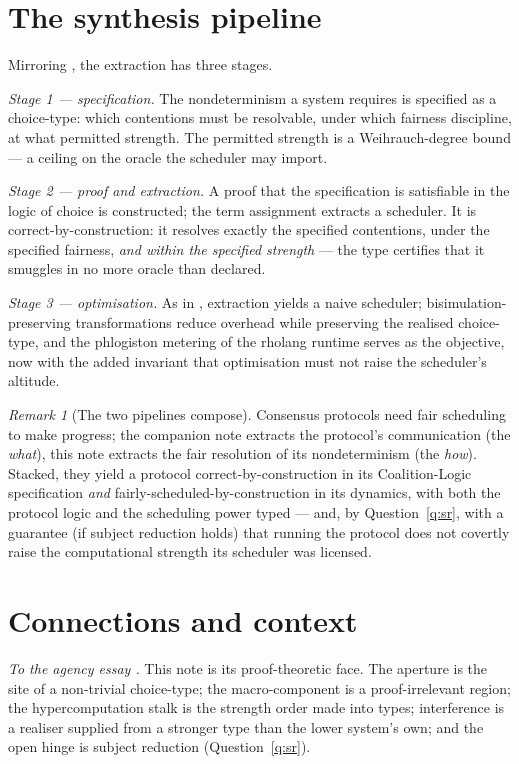 \documentclass[11pt]{article}
\theoremstyle{definition}
\theoremstyle{plain}
\theoremstyle{remark}
\newtheorem{remark}{Remark}
\begin{document}
\section{The synthesis pipeline}\label{sec:pipeline}

Mirroring \cite{consensus}, the extraction has three stages.

\emph{Stage 1 --- specification.} The nondeterminism a system requires is specified as a choice-type: which
contentions must be resolvable, under which fairness discipline, at what permitted strength. The permitted
strength is a Weihrauch-degree bound --- a ceiling on the oracle the scheduler may import.

\emph{Stage 2 --- proof and extraction.} A proof that the specification is satisfiable in the logic of choice is
constructed; the term assignment extracts a scheduler. It is correct-by-construction: it resolves exactly the
specified contentions, under the specified fairness, \emph{and within the specified strength} --- the type
certifies that it smuggles in no more oracle than declared.

\emph{Stage 3 --- optimisation.} As in \cite{consensus}, extraction yields a naive scheduler; bisimulation-preserving
transformations reduce overhead while preserving the realised choice-type, and the phlogiston metering of the
rholang runtime serves as the objective, now with the added invariant that optimisation must not raise the
scheduler's altitude.

\begin{remark}[The two pipelines compose]
Consensus protocols need fair scheduling to make progress; the companion note extracts the protocol's
communication (the \emph{what}), this note extracts the fair resolution of its nondeterminism (the \emph{how}).
Stacked, they yield a protocol correct-by-construction in its Coalition-Logic specification \emph{and}
fairly-scheduled-by-construction in its dynamics, with both the protocol logic and the scheduling power typed ---
and, by Question~\ref{q:sr}, with a guarantee (if subject reduction holds) that running the protocol does not
covertly raise the computational strength its scheduler was licensed.
\end{remark}

\section{Connections and context}\label{sec:conn}

\emph{To the agency essay \cite{agency}.} This note is its proof-theoretic face. The aperture is the site of a
non-trivial choice-type; the macro-component is a proof-irrelevant region; the hypercomputation stalk is the
strength order made into types; interference is a realiser supplied from a stronger type than the lower system's
own; and the open hinge is subject reduction (Question~\ref{q:sr}).
\end{document}
